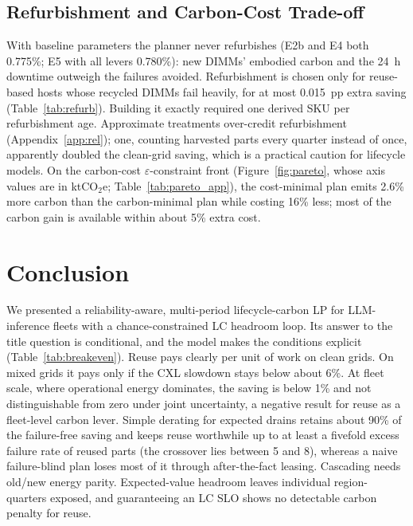 \documentclass{article} %
\begin{document}
\subsection{Refurbishment and Carbon-Cost Trade-off}
\label{sec:refurb}
\label{sec:robustness}
With baseline parameters the planner never refurbishes (E2b and E4 both 0.775\%; E5 with all levers 0.780\%): new DIMMs' embodied carbon and the 24~h downtime outweigh the failures avoided. Refurbishment is chosen only for reuse-based hosts whose recycled DIMMs fail heavily, for at most 0.015~pp extra saving (Table~\ref{tab:refurb}). Building it exactly required one derived SKU per refurbishment age. Approximate treatments over-credit refurbishment (Appendix~\ref{app:rel}); one, counting harvested parts every quarter instead of once, apparently doubled the clean-grid saving, which is a practical caution for lifecycle models. On the carbon-cost $\varepsilon$-constraint front (Figure~\ref{fig:pareto}, whose axis values are in ktCO$_2$e; Table~\ref{tab:pareto_app}), the cost-minimal plan emits 2.6\% more carbon than the carbon-minimal plan while costing 16\% less; most of the carbon gain is available within about 5\% extra cost.

\section{Conclusion}
\label{sec:conclusion}
We presented a reliability-aware, multi-period lifecycle-carbon LP for LLM-inference fleets with a chance-constrained LC headroom loop. Its answer to the title question is conditional, and the model makes the conditions explicit (Table~\ref{tab:breakeven}). Reuse pays clearly per unit of work on clean grids. On mixed grids it pays only if the CXL slowdown stays below about 6\%. At fleet scale, where operational energy dominates, the saving is below 1\% and not distinguishable from zero under joint uncertainty, a negative result for reuse as a fleet-level carbon lever. Simple derating for expected drains retains about 90\% of the failure-free saving and keeps reuse worthwhile up to at least a fivefold excess failure rate of reused parts (the crossover lies between 5 and 8), whereas a naive failure-blind plan loses most of it through after-the-fact leasing. Cascading needs old/new energy parity. Expected-value headroom leaves individual region-quarters exposed, and guaranteeing an LC SLO shows no detectable carbon penalty for reuse.
\end{document}
